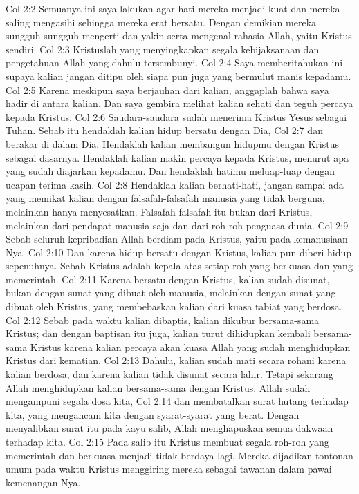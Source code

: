 Col 2:2  Semuanya ini saya lakukan agar hati mereka menjadi kuat dan mereka saling mengasihi sehingga mereka erat bersatu. Dengan demikian mereka sungguh-sungguh mengerti dan yakin serta mengenal rahasia Allah, yaitu Kristus sendiri.
Col 2:3  Kristuslah yang menyingkapkan segala kebijaksanaan dan pengetahuan Allah yang dahulu tersembunyi.
Col 2:4  Saya memberitahukan ini supaya kalian jangan ditipu oleh siapa pun juga yang bermulut manis kepadamu.
Col 2:5  Karena meskipun saya berjauhan dari kalian, anggaplah bahwa saya hadir di antara kalian. Dan saya gembira melihat kalian sehati dan teguh percaya kepada Kristus.
Col 2:6  Saudara-saudara sudah menerima Kristus Yesus sebagai Tuhan. Sebab itu hendaklah kalian hidup bersatu dengan Dia,
Col 2:7  dan berakar di dalam Dia. Hendaklah kalian membangun hidupmu dengan Kristus sebagai dasarnya. Hendaklah kalian makin percaya kepada Kristus, menurut apa yang sudah diajarkan kepadamu. Dan hendaklah hatimu meluap-luap dengan ucapan terima kasih.
Col 2:8  Hendaklah kalian berhati-hati, jangan sampai ada yang memikat kalian dengan falsafah-falsafah manusia yang tidak berguna, melainkan hanya menyesatkan. Falsafah-falsafah itu bukan dari Kristus, melainkan dari pendapat manusia saja dan dari roh-roh penguasa dunia.
Col 2:9  Sebab seluruh kepribadian Allah berdiam pada Kristus, yaitu pada kemanusiaan-Nya.
Col 2:10  Dan karena hidup bersatu dengan Kristus, kalian pun diberi hidup sepenuhnya. Sebab Kristus adalah kepala atas setiap roh yang berkuasa dan yang memerintah.
Col 2:11  Karena bersatu dengan Kristus, kalian sudah disunat, bukan dengan sunat yang dibuat oleh manusia, melainkan dengan sunat yang dibuat oleh Kristus, yang membebaskan kalian dari kuasa tabiat yang berdosa.
Col 2:12  Sebab pada waktu kalian dibaptis, kalian dikubur bersama-sama Kristus; dan dengan baptisan itu juga, kalian turut dihidupkan kembali bersama-sama Kristus karena kalian percaya akan kuasa Allah yang sudah menghidupkan Kristus dari kematian.
Col 2:13  Dahulu, kalian sudah mati secara rohani karena kalian berdosa, dan karena kalian tidak disunat secara lahir. Tetapi sekarang Allah menghidupkan kalian bersama-sama dengan Kristus. Allah sudah mengampuni segala dosa kita,
Col 2:14  dan membatalkan surat hutang terhadap kita, yang mengancam kita dengan syarat-syarat yang berat. Dengan menyalibkan surat itu pada kayu salib, Allah menghapuskan semua dakwaan terhadap kita.
Col 2:15  Pada salib itu Kristus membuat segala roh-roh yang memerintah dan berkuasa menjadi tidak berdaya lagi. Mereka dijadikan tontonan umum pada waktu Kristus menggiring mereka sebagai tawanan dalam pawai kemenangan-Nya.
